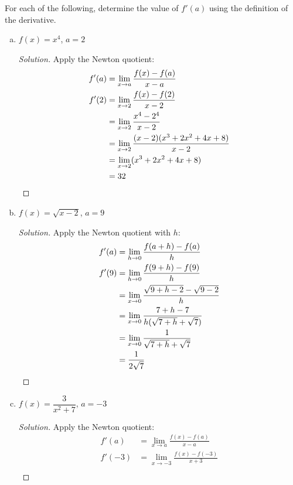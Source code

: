 \question For each of the following, determine the value of $f'(a)$ using the definition of the derivative.
\begin{enumerate}[(a)]
  \item $f(x) = x^4$, $a=2$
        \begin{proof}[Solution]
          Apply the Newton quotient:
          \begin{align*}
            f'(a) & = \lim_{x\to a}\frac{f(x)-f(a)}{x-a}            \\
            f'(2) & = \lim_{x\to 2}\frac{f(x)-f(2)}{x-2}            \\
                  & = \lim_{x\to 2}\frac{x^4-2^4}{x-2}              \\
                  & = \lim_{x\to 2}\frac{(x-2)(x^3+2x^2+4x+8)}{x-2} \\
                  & = \lim_{x\to 2}(x^3+2x^2+4x+8)                  \\
                  & = 32 \qedhere
          \end{align*}
        \end{proof}
  \item $f(x) = \sqrt{x-2}$, $a=9$
        \begin{proof}[Solution]
          Apply the Newton quotient with $h$:
          \begin{align*}
            f'(a) & = \lim_{h\to0}\frac{f(a+h)-f(a)}{h}                \\
            f'(9) & = \lim_{h\to0}\frac{f(9+h)-f(9)}{h}                \\
                  & = \lim_{x\to0}\frac{\sqrt{9+h-2}-\sqrt{9-2}}{h}    \\
                  & = \lim_{x\to0}\frac{7+h-7}{h(\sqrt{7+h}+\sqrt{7})} \\
                  & = \lim_{x\to0}\frac{1}{\sqrt{7+h}+\sqrt{7}}        \\
                  & = \frac{1}{2\sqrt{7}} \qedhere
          \end{align*}
        \end{proof}
  \item $f(x) = \dfrac{3}{x^2+7}$, $a=-3$
        \begin{proof}[Solution]
          Apply the Newton quotient:
          \begin{align*}
            f'(a)  & = \lim_{x\to a}\frac{f(x)-f(a)}{x-a}                          \\
            f'(-3) & = \lim_{x\to-3}\frac{f(x)-f(-3)}{x+3}                         \\

\end{align*}
\end{proof}
\end{enumerate}
